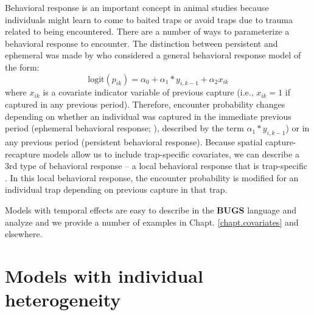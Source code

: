 Behavioral response is an important concept in animal studies
because individuals might learn to come to baited traps or avoid traps
due to trauma related to being encountered.  There are a number of
ways to parameterize a behavioral response to encounter. The
distinction between persistent and ephemeral was made by
\citet{yang_chao:2005} who considered a general behavioral response
model of the form:
\[
\mbox{logit}(p_{ik}) = \alpha_{0} + \alpha_{1}*y_{i,k-1} + \alpha_{2} x_{ik}
\]
where $x_{ik}$ is a covariate indicator variable of previous capture
(i.e., $x_{ik} = 1$ if captured in any previous period). Therefore,
encounter probability changes depending on whether an individual was
captured in the immediate previous period (ephemeral behavioral
response; \citep{yang_chao:2005}), described by the term
$\alpha_{1}*y_{i,k-1}$) or in any previous period (persistent behavioral
response).
Because spatial capture-recapture models allow us to include
trap-specific covariates, we can describe a 3rd type of behavioral
response -- a local behavioral response that is trap-specific
\citep{royle_etal:2011jwm}. In this local behavioral response, the
encounter probability is modified for an individual trap depending on
previous capture in that trap.

Models with temporal effects are easy to describe in the {\bf BUGS} language
and analyze and we provide a number of examples in
Chapt. \ref{chapt.covariates} and elsewhere.


\section{ Models with individual heterogeneity}
\label{closed.sec.modelmh}

